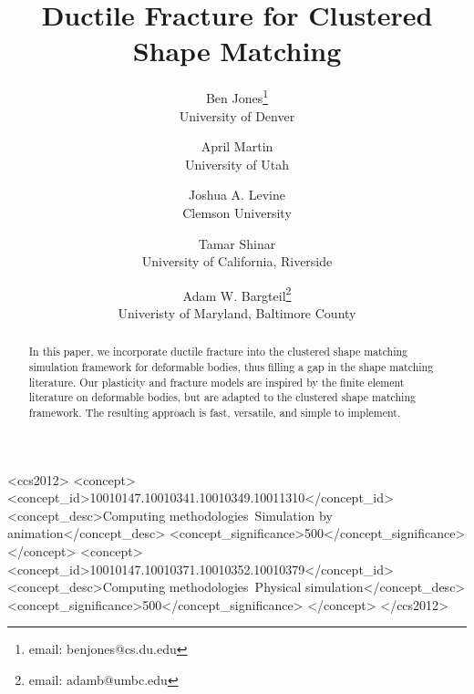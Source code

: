 \documentclass[conference]{acmsiggraph}
\title{Ductile Fracture for Clustered Shape Matching}
\author{Ben Jones\thanks{email: benjones@cs.du.edu}\\University of Denver \and April Martin\\University of Utah
\and Joshua A. Levine\\Clemson University
\and Tamar Shinar\\University of California, Riverside\vspace{0.1in}
\and Adam W. Bargteil\thanks{email: adamb@umbc.edu}\\Univeristy of Maryland, Baltimore County}
\begin{document}




\maketitle

\begin{abstract}
In this paper, we incorporate ductile fracture into the clustered shape matching simulation framework
for deformable bodies, thus filling a gap in the shape matching literature.  
Our plasticity and fracture models are inspired by the finite element literature on deformable bodies, 
but are adapted to the clustered shape matching framework.
The resulting approach is fast, versatile, and simple to implement.
\end{abstract}

\begin{CCSXML}
<ccs2012>
<concept>
<concept_id>10010147.10010341.10010349.10011310</concept_id>
<concept_desc>Computing methodologies~Simulation by animation</concept_desc>
<concept_significance>500</concept_significance>
</concept>
<concept>
<concept_id>10010147.10010371.10010352.10010379</concept_id>
<concept_desc>Computing methodologies~Physical simulation</concept_desc>
<concept_significance>500</concept_significance>
</concept>
</ccs2012>
\end{CCSXML}

\end{document}
